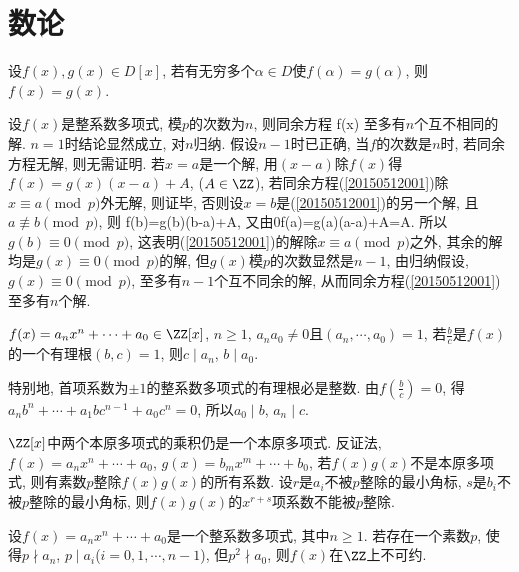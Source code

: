 
\section{数论}
设$f(x),g(x)\in D[x]$, 若有无穷多个$\alpha\in D$使$f(\alpha)=g(\alpha)$, 则$f(x)=g(x)$.
\et

设$f(x)$是整系数多项式, 模$p$的次数为$n$, 则同余方程
\be\label{20150512001}
f(x)
\ee
至多有$n$个互不相同的解.
\et
\ba
$n=1$时结论显然成立, 对$n$归纳. 假设$n-1$时已正确, 当$f$的次数是$n$时, 若同余方程无解, 则无需证明.
若$x=a$是一个解, 用$(x-a)$除$f(x)$得$f(x)=g(x)(x-a)+A$, ($A\in\ZZ$), 若同余方程(\ref{20150512001})除$x\equiv a\pmod{p}$外无解, 则证毕, 
否则设$x=b$是(\ref{20150512001})的另一个解, 且$a\not\equiv b\pmod{p}$, 则
\equiv f(b)=g(b)(b-a)+A, \textrm{又由}0\equiv f(a)=g(a)(a-a)+A=A.
\eee
所以$g(b)\equiv0\pmod{p}$, 这表明(\ref{20150512001})的解除$x\equiv a\pmod{p}$之外, 其余的解均是$g(x)\equiv0\pmod{p}$的解, 
但$g(x)$模$p$的次数显然是$n-1$, 由归纳假设, $g(x)\equiv 0\pmod{p}$, 至多有$n-1$个互不同余的解, 从而同余方程(\ref{20150512001})至多有$n$个解.
\ea

$f(x)=a_nx^n+\cdots+a_0\in\ZZ[x]$, $n\ge1$, $a_na_0\ne0$且$(a_n,\cdots, a_0)=1$, 若$\frac{b}{c}$是$f(x)$的一个有理根$(b,c)=1$, 
则$c\mid a_n$, $b\mid a_0$.

特别地, 首项系数为$\pm 1$的整系数多项式的有理根必是整数.
\et
\ba
由$f\left(\frac{b}{c}\right)=0$, 得$a_nb^n+\cdots+a_1bc^{n-1}+a_0c^n=0$, 所以$a_0\mid b$, $a_n\mid c$.

{\color{red}{一种证明有理数是整数的证明途径: 证复数是整数, 先证其是有理数, 且找到作为零点的首一多项式.}}
\ea

$\ZZ[x]$中两个本原多项式的乘积仍是一个本原多项式.
\et
\ba
反证法, $f(x)=a_nx^n+\cdots+a_0$, $g(x)=b_mx^m+\cdots+b_0$, 若$f(x)g(x)$不是本原多项式, 则有素数$p$整除$f(x)g(x)$的所有系数.
设$r$是$a_i$不被$p$整除的最小角标, $s$是$b_i$不被$p$整除的最小角标, 则$f(x)g(x)$的$x^{r+s}$项系数不能被$p$整除.
\ea

设$f(x)=a_nx^n+\cdots+a_0$是一个整系数多项式, 其中$n\ge1$. 若存在一个素数$p$, 使得$p\nmid a_n$, $p\mid a_i$($i=0,1,\cdots,n-1$), 
但$p^2\nmid a_0$, 则$f(x)$在$\ZZ$上不可约.
\et

